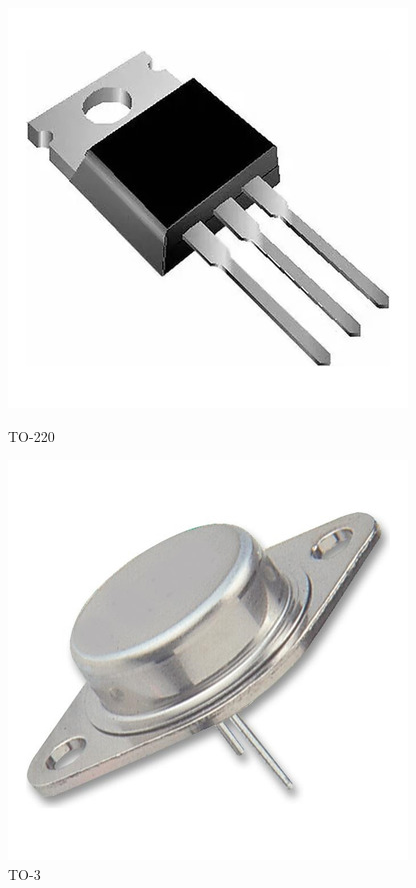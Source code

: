 \documentclass[chaptersright]{informeutn}
\begin{document}
          \begin{figure}[H]
            \centering
            \begin{minipage}[b]{0.35\textwidth}
                \centering
                \includegraphics[width=\textwidth]{pictures/to220.jpg}
                \caption*{TO-220}
            \end{minipage}
            \hfill
            \begin{minipage}[b]{0.35\textwidth}
                \centering
                \includegraphics[width=\textwidth]{pictures/to3.jpg}
                \caption*{TO-3}
            \end{minipage}
          \end{figure}
          
\end{document}
